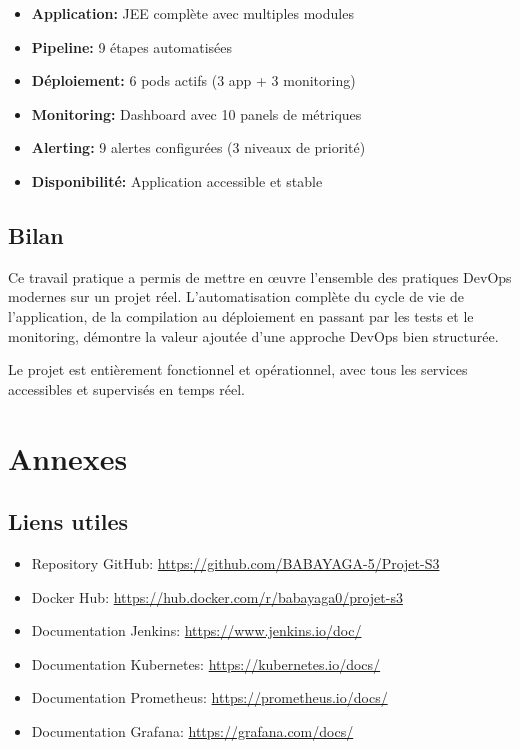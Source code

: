 \documentclass[12pt,a4paper]{article}
\begin{document}
\begin{tcolorbox}[colback=blue!5!white,colframe=blue!75!black,title=Résumé des réalisations]
    \begin{itemize}
        \item \textbf{Application:} JEE complète avec multiples modules
        \item \textbf{Pipeline:} 9 étapes automatisées
        \item \textbf{Déploiement:} 6 pods actifs (3 app + 3 monitoring)
        \item \textbf{Monitoring:} Dashboard avec 10 panels de métriques
        \item \textbf{Alerting:} 9 alertes configurées (3 niveaux de priorité)
        \item \textbf{Disponibilité:} Application accessible et stable
    \end{itemize}
\end{tcolorbox}

\subsection{Bilan}

Ce travail pratique a permis de mettre en œuvre l'ensemble des pratiques DevOps modernes sur un projet réel. L'automatisation complète du cycle de vie de l'application, de la compilation au déploiement en passant par les tests et le monitoring, démontre la valeur ajoutée d'une approche DevOps bien structurée.

Le projet est entièrement fonctionnel et opérationnel, avec tous les services accessibles et supervisés en temps réel.

\newpage

\section{Annexes}

\subsection{Liens utiles}

\begin{itemize}
    \item Repository GitHub: \url{https://github.com/BABAYAGA-5/Projet-S3}
    \item Docker Hub: \url{https://hub.docker.com/r/babayaga0/projet-s3}
    \item Documentation Jenkins: \url{https://www.jenkins.io/doc/}
    \item Documentation Kubernetes: \url{https://kubernetes.io/docs/}
    \item Documentation Prometheus: \url{https://prometheus.io/docs/}
    \item Documentation Grafana: \url{https://grafana.com/docs/}
\end{itemize}
\end{document}
